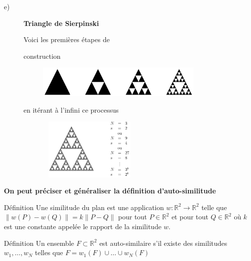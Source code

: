 \documentclass[aspectratio=1610]{beamer}
\begin{document}
\begin{frame}
\begin{description}
    \item[e)] \textbf{Triangle de Sierpinski}
\begin{minipage}[b]{0.4\textwidth}
 Voici les premières étapes de

 construction 
\begin{figure}[h]
        \includegraphics[width=0.8\textwidth,left]{IMG_1487}
        \label{fig:IMG_1487}
    \end{figure}
\end{minipage}%
\begin{minipage}[b]{0.5\textwidth}
en itérant à l'infini ce processus
\begin{figure}[h]
        \includegraphics[width=5cm,height=3cm,left]{IMG_1488}
        \label{fig:IMG_1488}
    \end{figure}
\end{minipage}
\end{description}
\textbf{On peut préciser et généraliser la définition d'auto-similitude}
 \begin{block}{Définition}
    Une similitude du plan est une application $ w: \mathbb{R}^{2} \to \mathbb{R}^{2} $ telle que $\|w(P)-w(Q)\|=k\|P-Q\|$ pour tout $P \in \mathbb{R}^{2}$ et pour tout $Q\in \mathbb{R}^{2}$ où $k$ est une constante appelée le rapport de la similitude $w$.
\end{block}
\begin{block}{Définition}
    Un ensemble $F\subset \mathbb{R}^{2}$ est auto-similaire s'il existe des similitudes $w_1, \ldots , w_{N}$ telles que $F=w_1(F)\cup \ldots \cup w_{N}(F)$
\end{block}
\end{frame}
\end{document}
